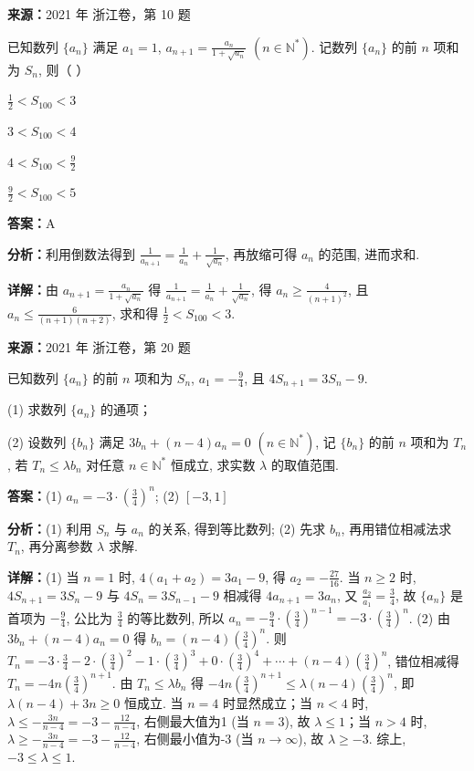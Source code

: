 \begin{question}[points=4]
\textbf{来源：}2021 年 浙江卷，第 10 题\par
已知数列 $\{a_n\}$ 满足 $a_1=1$, $a_{n+1} = \frac{a_n}{1+\sqrt{a_n}}$ $(n\in\mathbb{N}^*)$. 记数列 $\{a_n\}$ 的前 $n$ 项和为 $S_n$, 则（   ）
\begin{choices}
  \item $\frac{1}{2} < S_{100} < 3$
  \item $3 < S_{100} < 4$
  \item $4 < S_{100} < \frac{9}{2}$
  \item $\frac{9}{2} < S_{100} < 5$
\end{choices}
\begin{solution}
\textbf{答案：}A

\textbf{分析：}利用倒数法得到 $\frac{1}{a_{n+1}} = \frac{1}{a_n} + \frac{1}{\sqrt{a_n}}$, 再放缩可得 $a_n$ 的范围, 进而求和.

\textbf{详解：}由 $a_{n+1} = \frac{a_n}{1+\sqrt{a_n}}$ 得 $\frac{1}{a_{n+1}} = \frac{1}{a_n} + \frac{1}{\sqrt{a_n}}$, 得 $a_n \geq \frac{4}{(n+1)^2}$, 且 $a_n \leq \frac{6}{(n+1)(n+2)}$, 求和得 $\frac{1}{2} < S_{100} < 3$.
\end{solution}
\end{question}

\begin{question}[points=15]
\textbf{来源：}2021 年 浙江卷，第 20 题\par
已知数列 $\{a_n\}$ 的前 $n$ 项和为 $S_n$, $a_1=-\frac94$, 且 $4S_{n+1}=3S_n-9$.

(1) 求数列 $\{a_n\}$ 的通项；

(2) 设数列 $\{b_n\}$ 满足 $3b_n+(n-4)a_n=0$ $(n\in\mathbb{N}^*)$, 记 $\{b_n\}$ 的前 $n$ 项和为 $T_n$, 若 $T_n \leq \lambda b_n$ 对任意 $n\in\mathbb{N}^*$ 恒成立, 求实数 $\lambda$ 的取值范围.
\begin{solution}
\textbf{答案：}(1) $a_n = -3\cdot\left(\frac34\right)^n$; (2) $[-3,1]$

\textbf{分析：}(1) 利用 $S_n$ 与 $a_n$ 的关系, 得到等比数列; (2) 先求 $b_n$, 再用错位相减法求 $T_n$, 再分离参数 $\lambda$ 求解.

\textbf{详解：}(1) 当 $n=1$ 时, $4(a_1+a_2)=3a_1-9$, 得 $a_2=-\frac{27}{16}$. 当 $n\geq2$ 时, $4S_{n+1}=3S_n-9$ 与 $4S_n=3S_{n-1}-9$ 相减得 $4a_{n+1}=3a_n$, 又 $\frac{a_2}{a_1}=\frac34$, 故 $\{a_n\}$ 是首项为 $-\frac94$, 公比为 $\frac34$ 的等比数列, 所以 $a_n = -\frac94\cdot\left(\frac34\right)^{n-1} = -3\cdot\left(\frac34\right)^n$.
(2) 由 $3b_n+(n-4)a_n=0$ 得 $b_n = (n-4)\left(\frac34\right)^n$. 则 $T_n = -3\cdot\frac34 -2\cdot\left(\frac34\right)^2 -1\cdot\left(\frac34\right)^3 +0\cdot\left(\frac34\right)^4 +\cdots+(n-4)\left(\frac34\right)^n$, 错位相减得 $T_n = -4n\left(\frac34\right)^{n+1}$. 由 $T_n\leq\lambda b_n$ 得 $-4n\left(\frac34\right)^{n+1} \leq \lambda (n-4)\left(\frac34\right)^n$, 即 $\lambda(n-4) + 3n \geq 0$ 恒成立. 当 $n=4$ 时显然成立；当 $n<4$ 时, $\lambda \leq -\frac{3n}{n-4} = -3-\frac{12}{n-4}$, 右侧最大值为1 (当 $n=3$), 故 $\lambda\leq1$；当 $n>4$ 时, $\lambda \geq -\frac{3n}{n-4} = -3-\frac{12}{n-4}$, 右侧最小值为-3 (当 $n\to\infty$), 故 $\lambda\geq-3$. 综上, $-3\leq\lambda\leq1$.
\end{solution}
\end{question}

